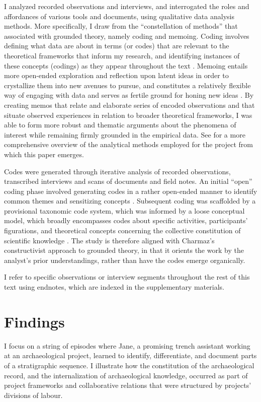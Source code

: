 \documentclass{article}
\begin{document}
I analyzed recorded observations and interviews, and interrogated the
roles and affordances of various tools and documents, using qualitative
data analysis methods. More specifically, I draw from the
``constellation of methods'' that \textcite[14-15]{charmaz2014}
associated with grounded theory, namely coding and memoing. Coding
involves defining what data are about in terms (or codes) that are
relevant to the theoretical frameworks that inform my research, and
identifying instances of these concepts (codings) as they appear
throughout the text \parencite[43]{charmaz2014}. Memoing entails more
open-ended exploration and reflection upon latent ideas in order to
crystallize them into new avenues to pursue, and constitutes a
relatively flexible way of engaging with data and serves as fertile
ground for honing new ideas \parencite[72]{charmaz2014}. By creating
memos that relate and elaborate series of encoded observations and that
situate observed experiences in relation to broader theoretical
frameworks, I was able to form more robust and thematic arguments about
the phenomena of interest while remaining firmly grounded in the
empirical data. See \textcite[9-10]{batist2024a} for a more
comprehensive overview of the analytical methods employed for the
project from which this paper emerges.

Codes were generated through iterative analysis of recorded
observations, transcribed interviews and scans of documents and field
notes. An initial ``open'' coding phase involved generating codes in a
rather open-ended manner to identify common themes and sensitizing
concepts \parencites{bowen2006}[30-31]{charmaz2014}. Subsequent coding was scaffolded by a
provisional taxonomic code system, which was informed by a loose
conceptual model, which broadly encompasses codes about specific
activities, participants' figurations, and theoretical concepts
concerning the collective constitution of scientific knowledge
\parencite[see][Appendix B for an overview of the code
system]{batist2023a}. The study is therefore aligned with Charmaz's
\parencite*{charmaz2000} constructivist approach to grounded theory, in
that it orients the work by the analyst's prior understandings, rather
than have the codes emerge organically.

I refer to specific observations or interview segments throughout the
rest of this text using endnotes, which are indexed in the supplementary
materials.

\section{Findings}
I focus on a string of episodes where Jane, a promising trench assistant
working at an archaeological project, learned to identify,
differentiate, and document parts of a stratigraphic sequence. I
illustrate how the constitution of the archaeological record, and the
internalization of archaeological knowledge, occurred as part of project
frameworks and collaborative relations that were structured by projects'
divisions of labour.
\end{document}
